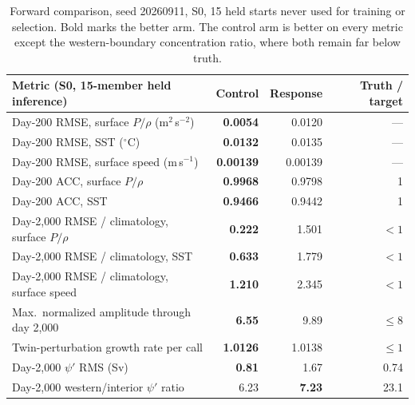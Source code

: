 \documentclass[3p,12pt]{elsarticle}
\begin{document}
\begin{table}[H]
\centering
\small
\begin{tabular}{lrrr}
\toprule
Metric (S0, 15-member held inference) & Control & Response & Truth / target \\
\midrule
Day-200 RMSE, surface $P/\rho$ (m$^2$\,s$^{-2}$) & \textbf{0.0054} & 0.0120 & --- \\
Day-200 RMSE, SST ($^\circ$C) & \textbf{0.0132} & 0.0135 & --- \\
Day-200 RMSE, surface speed (m\,s$^{-1}$) & \textbf{0.00139} & 0.00139 & --- \\
Day-200 ACC, surface $P/\rho$ & \textbf{0.9968} & 0.9798 & 1 \\
Day-200 ACC, SST & \textbf{0.9466} & 0.9442 & 1 \\
\midrule
Day-2{,}000 RMSE / climatology, surface $P/\rho$ & \textbf{0.222} & 1.501 & $<1$ \\
Day-2{,}000 RMSE / climatology, SST & \textbf{0.633} & 1.779 & $<1$ \\
Day-2{,}000 RMSE / climatology, surface speed & \textbf{1.210} & 2.345 & $<1$ \\
\midrule
Max.\ normalized amplitude through day 2{,}000 & \textbf{6.55} & 9.89 & $\le 8$ \\
Twin-perturbation growth rate per call & \textbf{1.0126} & 1.0138 & $\le 1$ \\
Day-2{,}000 $\psi'$ RMS (Sv) & \textbf{0.81} & 1.67 & 0.74 \\
Day-2{,}000 western/interior $\psi'$ ratio & 6.23 & \textbf{7.23} & 23.1 \\
\bottomrule
\end{tabular}
\caption{Forward comparison, seed 20260911, S0, 15 held starts never used for
training or selection. Bold marks the better arm. The control arm is better on
every metric except the western-boundary concentration ratio, where both remain
far below truth.}
\label{tab:forward}
\end{table}
\end{document}
